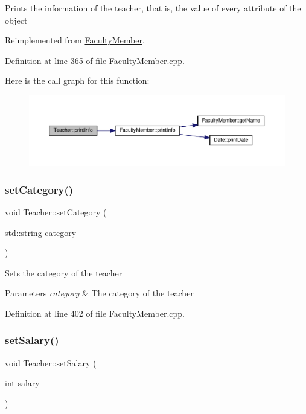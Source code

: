 Prints the information of the teacher, that is, the value of every attribute of the object 

Reimplemented from \hyperlink{classFacultyMember_af07c814d58d1a2e309c74a0c57b95fd1}{Faculty\+Member}.



Definition at line 365 of file Faculty\+Member.\+cpp.

Here is the call graph for this function\+:\nopagebreak
\begin{figure}[H]
\begin{center}
\leavevmode
\includegraphics[width=350pt]{classTeacher_ae1fc6d174a25c714bfb73abf4620de03_cgraph}
\end{center}
\end{figure}
\mbox{\label{classTeacher_ab713b38d67cafbe0d1c51eb73921e1a7}} 
\subsubsection{\texorpdfstring{set\+Category()}{setCategory()}}
{\footnotesize\ttfamily void Teacher\+::set\+Category (\begin{DoxyParamCaption}\item[{std\+::string}]{category }\end{DoxyParamCaption})}

Sets the category of the teacher 
\begin{DoxyParams}{Parameters}
{\em category} & The category of the teacher \\
\hline
\end{DoxyParams}


Definition at line 402 of file Faculty\+Member.\+cpp.

\mbox{\label{classTeacher_a3d87b4630b21c0d7a8aa4651593a0937}} 
\subsubsection{\texorpdfstring{set\+Salary()}{setSalary()}}
{\footnotesize\ttfamily void Teacher\+::set\+Salary (\begin{DoxyParamCaption}\item[{int}]{salary }\end{DoxyParamCaption})}

